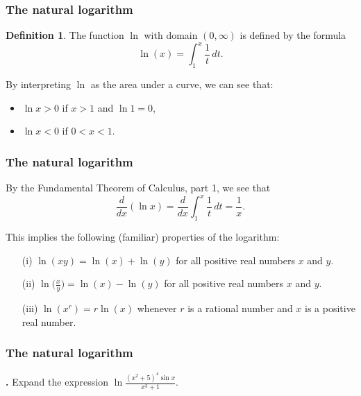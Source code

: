 \documentclass[t]{beamer}
\theoremstyle{plain}
\theoremstyle{definition}
\newtheorem{dfn}{Definition}
\newcommand{\ds}{\displaystyle}
\newcounter{heading}
\newcommand{\newhead}[1]{\medskip\stepcounter{heading}\noindent\textbf{\hspace{0.2cm}{#1}.}}
\begin{document}
\begin{frame}
\frametitle{The natural logarithm}
\begin{dfn} The function $\ln$ with domain $(0,\infty)$ is defined by the formula
\[\ln(x)=\int_1^x\frac{1}{t}\,dt.\]\end{dfn}\pause

\vspace*{.3cm}
\noindent By interpreting $\ln$ as the area under a curve, we can see that:
\begin{itemize}[<+->]
\item $\ln x>0$ if $x>1$ and $\ln1=0$,
\item $\ln x<0$ if $0<x<1$.
\end{itemize}
\end{frame}

\begin{frame}
\frametitle{The natural logarithm}
\noindent By the Fundamental Theorem of Calculus, part 1, we see that
\[ \frac{d}{dx}(\ln x) = \frac{d}{dx} \int_1^x\frac{1}{t}\,dt = \frac{1}{x}.\]\pause

\medskip

\noindent This implies the following (familiar) properties of the logarithm:
\begin{enumerate}[<+->]
\item[(i)] $\ln(xy)=\ln(x)+\ln(y)$ for all positive real numbers $x$ and $y$.
\item[(ii)] $\ds \ln\big(\tfrac{x}{y}\big)=\ln(x)-\ln(y)$ for all positive real numbers $x$ and $y$.
\item[(iii)] $\ln(x^r)=r\ln(x)$ whenever $r$ is a rational number and $x$ is a positive real number.
\end{enumerate}
\end{frame}

\begin{frame}
\frametitle{The natural logarithm}

\newhead{Example} Expand the expression $\ln \frac{(x^{2} + 5)^{4}\sin x}{x^{3}+1}$.
\end{frame}
\end{document}
